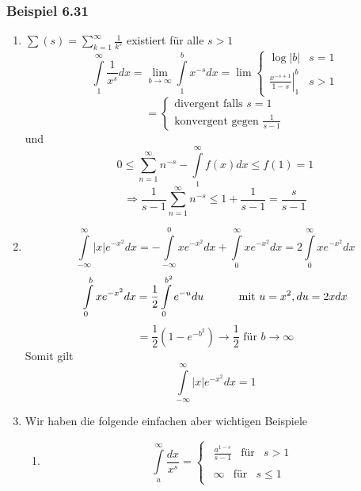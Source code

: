 \subsubsection*{Beispiel 6.31}%
\begin{enumerate}
\item $\sum {(s) = \sum\limits_{k = 1}^\infty  {\frac{1}{{{k^s}}}} } $ existiert für alle $s>1$
$$\int\limits_1^\infty  {\frac{1}{{{x^s}}}dx}  = \mathop {\lim }\limits_{b \to \infty } \int\limits_1^b {{x^{ - s}}dx}  = \lim \left\{ {\begin{array}{*{20}{c}}
{\log \left| b \right|}&{s = 1}\\
{\left. {\frac{{{x^{ - s + 1}}}}{{1 - s}}} \right|_1^b}&{s > 1}
\end{array}} \right. $$
$$= \left\{ {\begin{array}{*{20}{c}}
{\text{divergent falls }s = 1}\\
{\text{konvergent gegen }\frac{1}{{s - 1}}}
\end{array}} \right.$$
und
\[0 \le \sum\limits_{n = 1}^\infty  {{n^{ - s}}}  - \int\limits_1^\infty  {f(x)dx}  \le f(1) = 1\]
\[ \Rightarrow \frac{1}{{s - 1}}\sum\limits_{n = 1}^\infty  {{n^{ - s}}}  \le 1 + \frac{1}{{s - 1}} = \frac{s}{{s - 1}}\]
\item \[\int\limits_{ - \infty }^\infty  {\left| x \right|{e^{ - {x^2}}}dx}  =  - \int\limits_{ - \infty }^0 {x{e^{ - {x^2}}}dx}  + \int\limits_0^\infty  {x{e^{ - {x^2}}}dx}  = 2\int\limits_0^\infty  {x{e^{ - {x^2}}}dx} \]
\[\int\limits_0^b {x{e^{ - {x^2}}}dx = \frac{1}{2}\int\limits_0^{{b^2}} {{e^{ - u}}du} }\text{\hspace{10mm} mit }u=x^2, du=2xdx \]
\[ = \frac{1}{2}\left( {1 - {e^{ - {b^2}}}} \right) \to \frac{1}{2}\text{ für }b\to \infty\]
Somit gilt \[\int\limits_{ - \infty }^\infty  {\left| x \right|{e^{ - {x^2}}}dx = 1} \]
\item Wir haben die folgende einfachen aber wichtigen Beispiele
\begin{enumerate}
\item \[\int\limits_{ a }^\infty  {\frac{{dx}}{{{x^s}}}}  = \left\{ {\begin{array}{*{20}{c}}
{\begin{array}{*{20}{c}}
{\frac{{{a^{1 - s}}}}{{s - 1}}}&\text{für}&{s > 1}
\end{array}}\\
{\begin{array}{*{20}{c}}
\infty &{{\text{für}}}&{s \le 1}
\end{array}}
\end{array}} \right.\]


\end{enumerate}
\end{enumerate}
